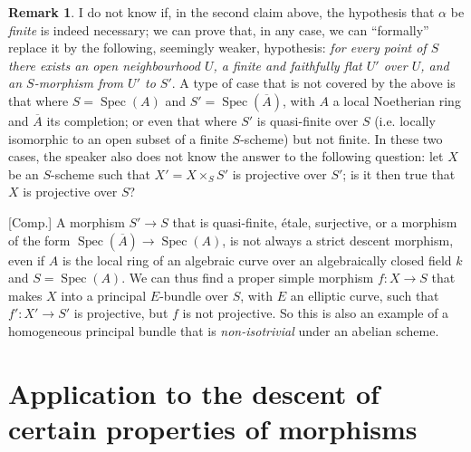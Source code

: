 \documentclass{article}
\theoremstyle{plain}
\theoremstyle{definition}
\newtheorem*{remark*}{Remark}
\DeclareMathOperator{\Spec}{Spec}
\begin{document}
\begin{remark*}
  I do not know if, in the second claim above, the hypothesis that $\alpha$ be \emph{finite} is indeed necessary;
  we can prove that, in any case, we can ``formally'' replace it by the following, seemingly weaker, hypothesis:
  \emph{for every point of $S$ there exists an open neighbourhood $U$, a finite and faithfully flat $U'$ over $U$, and an $S$-morphism from $U'$ to $S'$}.
  A type of case that is not covered by the above is that where $S=\Spec(A)$ and $S'=\Spec(\overline{A})$, with $A$ a local Noetherian ring and $\overline{A}$ its completion;
  or even that where $S'$ is quasi-finite over $S$ (i.e. locally isomorphic to an open subset of a finite $S$-scheme) but not finite.
  In these two cases, the speaker also does not know the answer to the following question:
  let $X$ be an $S$-scheme such that $X'=X\times_S S'$ is projective over $S'$;
  is it then true that $X$ is projective over $S$?

  [Comp.]
  A morphism $S'\to S$ that is quasi-finite, \'{e}tale, surjective, or a morphism of the form $\Spec(\overline{A})\to\Spec(A)$, is not always a strict descent morphism, even if $A$ is the local ring of an algebraic curve over an algebraically closed field $k$ and $S=\Spec(A)$.
  We can thus find a proper simple morphism $f\colon X\to S$ that makes $X$ into a principal $E$-bundle over $S$, with $E$ an elliptic curve, such that $f'\colon X'\to S'$ is projective, but $f$ is not projective.
  So this is also an example of a homogeneous principal bundle that is \emph{non-isotrivial} under an abelian scheme.
\end{remark*}


\section{Application to the descent of certain properties of morphisms}
\label{B.2}
\end{document}
